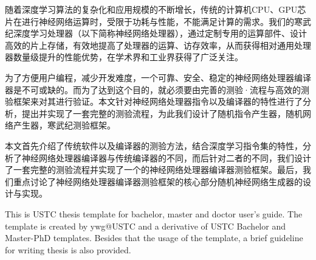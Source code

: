 ﻿\begin{cnabstract}
随着深度学习算法的复杂化和应用规模的不断增长，传统的计算机CPU、GPU芯片在进行神经网络运算时，受限于功耗与性能，不能满足计算的需求。我们的寒武纪深度学习处理器（以下简称神经网络处理器），通过定制专用的运算部件、设计高效的片上存储，有效地提高了处理器的运算、访存效率，从而获得相对通用处理器数量级提升的性能优势，在学术界和工业界获得了广泛关注。

为了方便用户编程，减少开发难度，一个可靠、安全、稳定的神经网络处理器编译器是不可或缺的。而为了达到这个目的，就必须要由完善的测验·流程与高效的测验框架来对其进行验证。本文针对神经网络处理器指令以及编译器的特性进行了分析，提出并实现了一套完整的测验流程，为此我们设计了随机指令产生器，随机网络产生器，寒武纪测验框架。

本文首先介绍了传统软件以及编译器的测验方法，结合深度学习指令集的特性，分析了神经网络处理器编译器与传统编译器的不同，而后针对二者的不同，我们设计了一套完整的测验流程并实现了一个的神经网络处理器编译器测验框架。最后，我们重点讨论了神经网络处理器编译器测验框架的核心部分随机神经网络生成器的设计与实现。

\end{cnabstract}

\begin{enabstract}
This is USTC thesis template for bachelor, master and doctor user's guide. The template is created by ywg@USTC and a derivative of USTC Bachelor and Master-PhD templates. Besides that
the usage of the template, a brief
guideline for writing thesis is also provided.

\end{enabstract}
